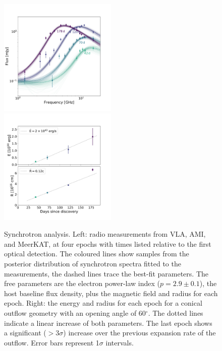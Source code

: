 \documentclass{nature_plusfigure}
\newcommand{\arcdeg}{\mbox{$^\circ$}}
\begin{document}
\begin{figure}
\includegraphics[width=0.50\textwidth]{figures/at2019dsg_radio.pdf}
\includegraphics[width=0.50\textwidth]{figures/at2019dsg_ER_nonEqp.pdf}
\caption{Synchrotron analysis. Left: radio measurements from VLA, AMI, and MeerKAT, at four epochs with times listed relative to the first optical detection. The coloured lines show samples from the posterior distribution of synchrotron spectra fitted to the measurements, the dashed lines trace the best-fit parameters. The free parameters are the electron power-law index ($p=2.9\pm 0.1$), the host baseline flux density, plus the magnetic field and radius for each epoch. Right: the energy and radius for each epoch for a conical outflow geometry with an opening angle of 60\arcdeg. The dotted lines indicate a linear increase of both parameters. The last epoch shows a significant ($>3\sigma$) increase over the previous expansion rate of the outflow. Error bars represent 1$\sigma$ intervals.}
\label{fig:radio_spectrum}
\end{figure}
\newpage
\end{document}
